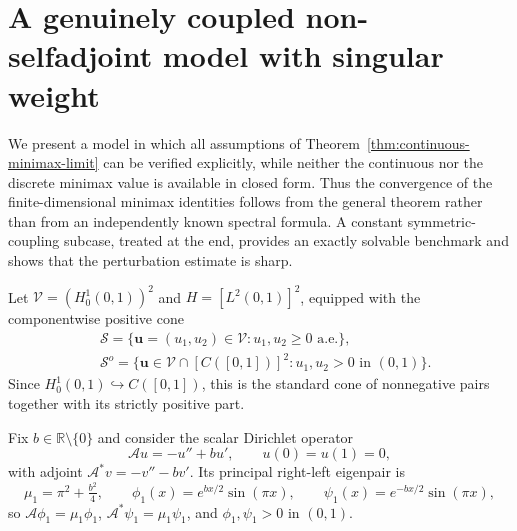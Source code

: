 \documentclass[preprint,10pt]{elsarticle}
\theoremstyle{plain}
\theoremstyle{definition}
\theoremstyle{remark}
\begin{document}
\section{A genuinely coupled non-selfadjoint model with singular weight}
\label{sec:complete-singular-weight-model}

We present a model in which all assumptions of
Theorem~\ref{thm:continuous-minimax-limit} can be verified explicitly, while
neither the continuous nor the discrete minimax value is available in closed
form. Thus the convergence of the finite-dimensional minimax identities
follows from the general theorem rather than from an independently known
spectral formula. A constant symmetric-coupling subcase, treated at the end,
provides an exactly solvable benchmark and shows that the perturbation
estimate is sharp.

Let $\mathcal{V}=(H_0^1(0,1))^2$ and $H=[L^2(0,1)]^2$, equipped with the
componentwise positive cone
\begin{align*}
	&\mathcal S=\{\mathbf u=(u_1,u_2)\in\mathcal V: u_1,u_2\ge0\text{ a.e.}\},\\
	&\mathcal S^o=\{\mathbf u\in\mathcal V\cap[C([0,1])]^2: u_1,u_2>0\text{ in }(0,1)\}.
\end{align*}
Since $H_0^1(0,1)\hookrightarrow C([0,1])$, this is the standard cone of
nonnegative pairs together with its strictly positive part.

Fix $b\in\mathbb R\setminus\{0\}$ and consider the scalar Dirichlet operator
\begin{equation}\label{eq:complete-model-scalar-operator}
	\mathcal Au=-u''+bu', \qquad u(0)=u(1)=0,
\end{equation}
with adjoint \(\mathcal A^*v=-v''-bv'\). Its principal right-left eigenpair is
\begin{equation}\label{eq:complete-model-scalar-eigenpair}
	\mu_1=\pi^2+\tfrac{b^2}{4}, \qquad
	\phi_1(x)=e^{bx/2}\sin(\pi x), \qquad
	\psi_1(x)=e^{-bx/2}\sin(\pi x),
\end{equation}
so $\mathcal A\phi_1=\mu_1\phi_1$, $\mathcal A^*\psi_1=\mu_1\psi_1$, and
$\phi_1,\psi_1>0$ in $(0,1)$.
\end{document}
